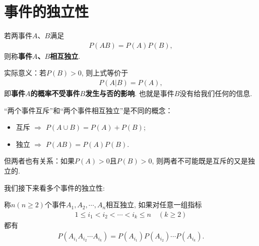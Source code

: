 \section{事件的独立性}

\begin{definition}
    若两事件$A$、$B$满足
    \begin{align*}
        P(AB)= P(A) P(B),
    \end{align*}
    则称\textbf{事件$A$、$B$相互独立}. %
\end{definition}

实际意义：若$P(B)>0$, 则上式等价于
\begin{align*}
    P(A|B)= P(A),
\end{align*}
即\textbf{事件$A$的概率不受事件$B$发生与否的影响}.  也就是事件$B$没有给我们任何的信息.

\begin{remark}
    ``两个事件互斥''和``两个事件相互独立''是不同的概念：
    \begin{itemize}
        \item 互斥 $\Rightarrow$ $P(A\cup B)=P(A)+P(B)$; 
        \item 独立 $\Rightarrow$ $P(AB)=P(A)P(B)$. 
    \end{itemize}
    但两者也有关系：如果$P(A)>0$且$P(B)>0$, 则两者不可能既是互斥的又是独立的. 
\end{remark}

我们接下来看多个事件的独立性:

\begin{definition}
    称$n(n\ge 2)$个事件$A_1, A_2, \cdots, A_n$相互独立, 如果对任意一组指标
    \begin{align*}
        1\le i_1<i_2< \cdots <i_k\le n\quad (k\ge 2)
    \end{align*}
    都有
    \begin{align*}
        P(A_{i_1}A_{i_2}\cdots A_{i_k})=P(A_{i_1})P(A_{i_2})\cdots  P(A_{i_k}).
    \end{align*}
\end{definition}

